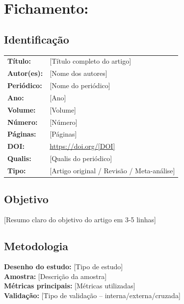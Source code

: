 \section{Fichamento: }

\subsection{Identificação}
\begin{tabular}{ll}
\textbf{Título:} & [Título completo do artigo] \\
\textbf{Autor(es):} & [Nome dos autores] \\
\textbf{Periódico:} & [Nome do periódico] \\
\textbf{Ano:} & [Ano] \\
\textbf{Volume:} & [Volume] \\
\textbf{Número:} & [Número] \\
\textbf{Páginas:} & [Páginas] \\
\textbf{DOI:} & \url{https://doi.org/[DOI]} \\
\textbf{Qualis:} & [Qualis do periódico] \\
\textbf{Tipo:} & [Artigo original / Revisão / Meta-análise] \\
\end{tabular}

\subsection{Objetivo}
[Resumo claro do objetivo do artigo em 3-5 linhas]

\subsection{Metodologia}
\textbf{Desenho do estudo:} [Tipo de estudo] \\
\textbf{Amostra:} [Descrição da amostra] \\
\textbf{Métricas principais:} [Métricas utilizadas] \\
\textbf{Validação:} [Tipo de validação -- interna/externa/cruzada] \\

